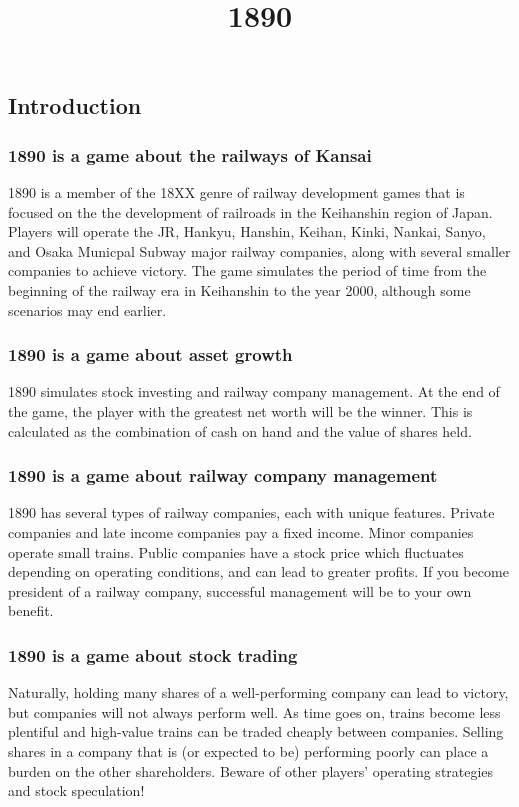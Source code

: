 \documentclass{article}
\title{1890}
\begin{document}
\begin{CJK}{UTF8}{min}
\begin{multicols}{2}
\section*{Introduction}

\subsubsection*{1890 is a game about the railways of Kansai}
1890 is a member of the 18XX genre of railway development games that
is focused on the the development of railroads in the Keihanshin
region of Japan. Players will operate the JR, Hankyu, Hanshin, Keihan,
Kinki, Nankai, Sanyo, and Osaka Municpal Subway major railway
companies, along with several smaller companies to achieve
victory. The game simulates the period of time from the beginning of
the railway era in Keihanshin to the year 2000, although some
scenarios may end earlier.

\subsubsection*{1890 is a game about asset growth}
1890 simulates stock investing and railway company management. At the end
of the game, the player with the greatest net worth will be the
winner. This is calculated as the combination of cash on hand and
the value of shares held.

\subsubsection*{1890 is a game about railway company management}
1890 has several types of railway companies, each with unique
features. Private companies and late income companies pay a fixed
income. Minor companies operate small trains. Public companies have a
stock price which fluctuates depending on operating conditions, and
can lead to greater profits. If you become president of a railway
company, successful management will be to your own benefit.

\subsubsection*{1890 is a game about stock trading}
Naturally, holding many shares of a well-performing company can lead
to victory, but companies will not always perform well. As time goes
on, trains become less plentiful and high-value trains can be traded
cheaply between companies. Selling shares in a company that is (or
expected to be) performing poorly can place a burden on the other
shareholders. Beware of other players' operating strategies and stock
speculation!


\end{multicols}
\end{CJK}
\end{document}
